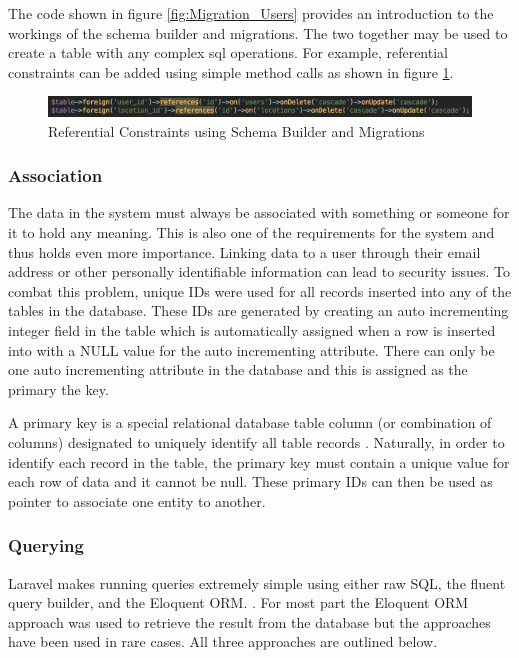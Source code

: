 The code shown in figure \ref{fig:Migration_Users} provides an introduction to the workings of the schema builder and migrations. The two together may be used to create a table with any complex sql operations. For example, referential constraints can be added using simple method calls as shown in figure \ref{fig:Referential_Constraints}.

\begin{figure}[H]
	\centering
	\includegraphics[width=1.0\textwidth]{images/Code/Referential_Constraints}
	\caption{Referential Constraints using Schema Builder and Migrations} \label{fig:Referential_Constraints}
\end{figure}

\subsubsection{Association}
The data in the system must always be associated with something or someone for it to hold any meaning. This is also one of the requirements for the system and thus holds even more importance. Linking data to a user through their email address or other personally identifiable information can lead to security issues. To combat this problem, unique IDs were used for all records inserted into any of the tables in the database. These IDs are generated by creating an auto incrementing integer field in the table which is automatically assigned when a row is inserted into with a NULL value for the auto incrementing attribute. There can only be one auto incrementing attribute in the database and this is assigned as the primary the key.

A primary key is a special relational database table column (or combination of columns) designated to uniquely identify all table records \cite{Techopedia:Primary_keys}. Naturally, in order to identify each record in the table, the primary key must contain a unique value for each row of data and it cannot be null. These primary IDs can then be used as pointer to associate one entity to another.

\subsubsection{Querying}
Laravel makes running queries extremely simple using either raw SQL, the fluent query builder, and the Eloquent ORM. \cite{Laravel:Database}. For most part the Eloquent ORM approach was used to retrieve the result from the database but the approaches have been used in rare cases. All three approaches are outlined below.

